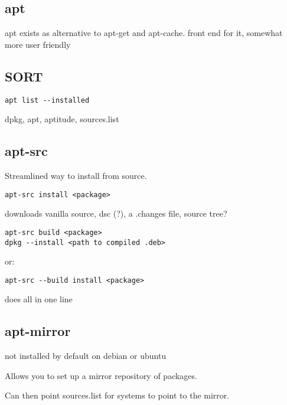 
\subsection{apt}
apt exists as alternative to apt-get and apt-cache. front end for it, somewhat more user friendly


\subsection{SORT}
\begin{verbatim}
apt list --installed
\end{verbatim}

dpkg, apt, aptitude, sources.list

\subsection{apt-src}

Streamlined way to install from source.




\begin{verbatim}
apt-src install <package>
\end{verbatim}

downloads vanilla source, dsc (?), a .changes file, source tree?

\begin{verbatim}
apt-src build <package>
dpkg --install <path to compiled .deb>
\end{verbatim}

or:
\begin{verbatim}
apt-src --build install <package>
\end{verbatim}

does all in one line



\subsection{apt-mirror}

not installed by default on debian or ubuntu


Allows you to set up a mirror repository of packages.

Can then point sources.list for systems to point to the mirror.
